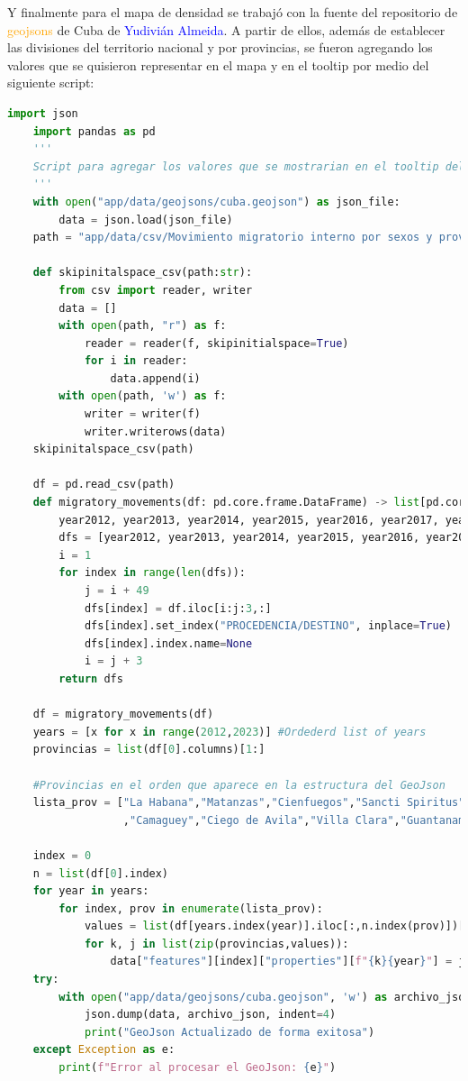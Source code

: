\documentclass{article}
\begin{document}
Y finalmente para el mapa de densidad se trabajó con la fuente del repositorio de \textcolor{orange}{geojsons} de Cuba de \textcolor{blue}{Yudivián Almeida}. A partir de ellos, además de establecer 
las divisiones del territorio nacional y por provincias, se fueron agregando los valores que se quisieron representar en el mapa y en el tooltip por medio del siguiente script:
\begin{lstlisting}[language=Python, caption=Script para agregar valores al geojson]
    import json 
    import pandas as pd
    '''
    Script para agregar los valores que se mostrarian en el tooltip del mapa al geojson
    '''
    with open("app/data/geojsons/cuba.geojson") as json_file:
        data = json.load(json_file)
    path = "app/data/csv/Movimiento migratorio interno por sexos y provincias.csv"
    
    def skipinitalspace_csv(path:str):
        from csv import reader, writer
        data = []
        with open(path, "r") as f:
            reader = reader(f, skipinitialspace=True)
            for i in reader:
                data.append(i)
        with open(path, 'w') as f:
            writer = writer(f)
            writer.writerows(data)
    skipinitalspace_csv(path)
    
    df = pd.read_csv(path)
    def migratory_movements(df: pd.core.frame.DataFrame) -> list[pd.core.frame.DataFrame]:
        year2012, year2013, year2014, year2015, year2016, year2017, year2018, year2019, year2020, year2021, year2022 = 0,0,0,0,0,0,0,0,0,0,0
        dfs = [year2012, year2013, year2014, year2015, year2016, year2017, year2018, year2019, year2020, year2021, year2022]
        i = 1
        for index in range(len(dfs)):
            j = i + 49
            dfs[index] = df.iloc[i:j:3,:]
            dfs[index].set_index("PROCEDENCIA/DESTINO", inplace=True)
            dfs[index].index.name=None
            i = j + 3
        return dfs
    
    df = migratory_movements(df)
    years = [x for x in range(2012,2023)] #Ordederd list of years
    provincias = list(df[0].columns)[1:]
    
    #Provincias en el orden que aparece en la estructura del GeoJson
    lista_prov = ["La Habana","Matanzas","Cienfuegos","Sancti Spiritus","Las Tunas","Holguin","Granma","Santiago de Cuba","Isla de la Juventud"
                  ,"Camaguey","Ciego de Avila","Villa Clara","Guantanamo","Pinar del Rio","Artemisa","Mayabeque"] 
    
    index = 0
    n = list(df[0].index)
    for year in years:    
        for index, prov in enumerate(lista_prov):
            values = list(df[years.index(year)].iloc[:,n.index(prov)])[1:]
            for k, j in list(zip(provincias,values)):
                data["features"][index]["properties"][f"{k}{year}"] = j    
    try:
        with open("app/data/geojsons/cuba.geojson", 'w') as archivo_json:
            json.dump(data, archivo_json, indent=4)
            print("GeoJson Actualizado de forma exitosa")
    except Exception as e:
        print(f"Error al procesar el GeoJson: {e}") 
\end{lstlisting}
\end{document}
